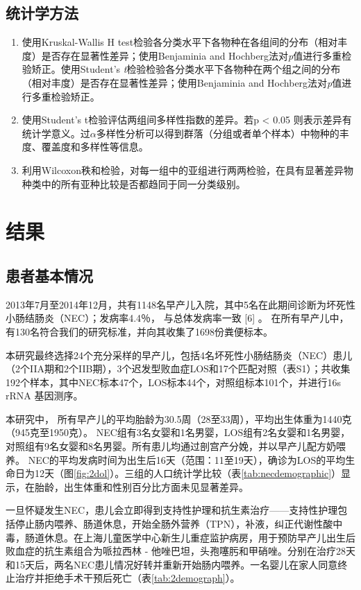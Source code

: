   \subsection{统计学方法}
  \label{统计学方法}
    \begin{enumerate}
      \item 使用Kruskal-Wallis H test检验各分类水平下各物种在各组间的分布（相对丰度）是否存在显著性差异；使用Benjaminia and Hochberg法对\textit{p}值进行多重检验矫正。使用Student’s \textit{t}检验检验各分类水平下各物种在两个组之间的分布（相对丰度）是否存在显著性差异；使用Benjaminia and Hochberg法对\textit{p}值进行多重检验矫正。
      \item 使用Student’s t检验评估两组间多样性指数的差异。若p < 0.05 则表示差异有统计学意义。过$\alpha$多样性分析可以得到群落（分组或者单个样本）中物种的丰度、覆盖度和多样性等信息。
      \item 利用Wilcoxon秩和检验，对每一组中的亚组进行两两检验，在具有显著差异物种类中的所有亚种比较是否都趋同于同一分类级别。
    \end{enumerate}

\section{结果}
  \subsection{患者基本情况}
  2013年7月至2014年12月，共有1148名早产儿入院，其中5名在此期间诊断为坏死性小肠结肠炎（NEC）；发病率4.4％， 与总体发病率一致 [6] 。 在所有早产儿中，有130名符合我们的研究标准，并向其收集了1698份粪便标本。

  本研究最终选择24个充分采样的早产儿，包括4名坏死性小肠结肠炎（NEC）患儿（2个IIA期和2个IIB期），3个迟发型败血症LOS和17个匹配对照（表S1）；共收集192个样本，其中NEC标本47个，LOS标本44个，对照组标本101个，并进行16s rRNA 基因测序。

  本研究中， 所有早产儿的平均胎龄为30.5周（28至33周），平均出生体重为1440克（945克至1950克）。 NEC组有3名女婴和1名男婴，LOS组有2名女婴和1名男婴，对照组有9名女婴和8名男婴。所有患儿均通过剖宫产分娩，并以早产儿配方奶喂养。 NEC的平均发病时间为出生后16天（范围：11至19天），确诊为LOS的平均生命日为12天（图\ref{fig:2dol}）。三组的人口统计学比较（表\ref{tab:necdemographic}）显示，在胎龄，出生体重和性别百分比方面未见显著差异。

  一旦怀疑发生NEC，患儿会立即得到支持性护理和抗生素治疗——支持性护理包括停止肠内喂养、肠道休息，开始全肠外营养（TPN），补液，纠正代谢性酸中毒，肠道休息。在上海儿童医学中心新生儿重症监护病房，用于预防早产儿出生后败血症的抗生素组合为哌拉西林 - 他唑巴坦，头孢噻肟和甲硝唑。分别在治疗28天和15天后，两名NEC患儿情况好转并重新开始肠内喂养。一名婴儿在家人同意终止治疗并拒绝手术干预后死亡（表\ref{tab:2demograph}）。

